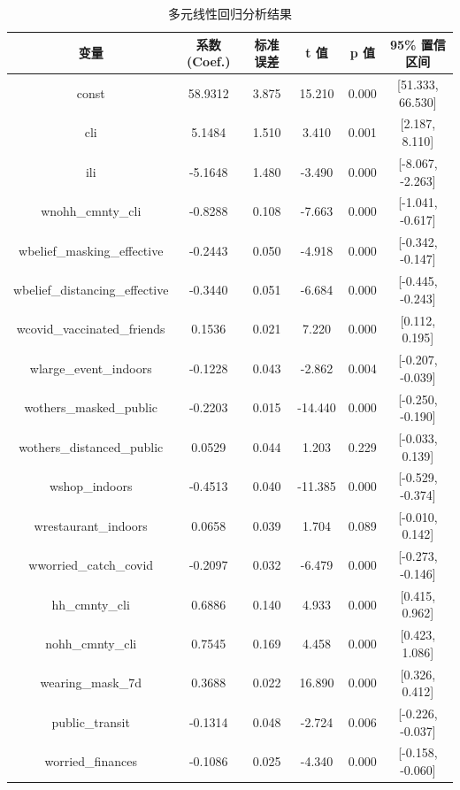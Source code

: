 \documentclass[UTF8,ctexart,a4paper,11pt,openany]{article}
\theoremstyle{definition}
\begin{document}
    \begin{table}[H]
    \centering
    \begin{tabular}{|c|c|c|c|c|c|}
        \hline
        \textbf{变量} & \textbf{系数 (Coef.)} & \textbf{标准误差} & \textbf{t 值} & \textbf{p 值} & \textbf{95\% 置信区间} \\
        \hline
        const & 58.9312 & 3.875 & 15.210 & 0.000 & [51.333, 66.530] \\
        \hline
        cli & 5.1484 & 1.510 & 3.410 & 0.001 & [2.187, 8.110] \\
        \hline
        ili & -5.1648 & 1.480 & -3.490 & 0.000 & [-8.067, -2.263] \\
        \hline
        wnohh\_cmnty\_cli & -0.8288 & 0.108 & -7.663 & 0.000 & [-1.041, -0.617] \\
        \hline
        wbelief\_masking\_effective & -0.2443 & 0.050 & -4.918 & 0.000 & [-0.342, -0.147] \\
        \hline
        wbelief\_distancing\_effective & -0.3440 & 0.051 & -6.684 & 0.000 & [-0.445, -0.243] \\
        \hline
        wcovid\_vaccinated\_friends & 0.1536 & 0.021 & 7.220 & 0.000 & [0.112, 0.195] \\
        \hline
        wlarge\_event\_indoors & -0.1228 & 0.043 & -2.862 & 0.004 & [-0.207, -0.039] \\
        \hline
        wothers\_masked\_public & -0.2203 & 0.015 & -14.440 & 0.000 & [-0.250, -0.190] \\
        \hline
        wothers\_distanced\_public & 0.0529 & 0.044 & 1.203 & 0.229 & [-0.033, 0.139] \\
        \hline
        wshop\_indoors & -0.4513 & 0.040 & -11.385 & 0.000 & [-0.529, -0.374] \\
        \hline
        wrestaurant\_indoors & 0.0658 & 0.039 & 1.704 & 0.089 & [-0.010, 0.142] \\
        \hline
        wworried\_catch\_covid & -0.2097 & 0.032 & -6.479 & 0.000 & [-0.273, -0.146] \\
        \hline
        hh\_cmnty\_cli & 0.6886 & 0.140 & 4.933 & 0.000 & [0.415, 0.962] \\
        \hline
        nohh\_cmnty\_cli & 0.7545 & 0.169 & 4.458 & 0.000 & [0.423, 1.086] \\
        \hline
        wearing\_mask\_7d & 0.3688 & 0.022 & 16.890 & 0.000 & [0.326, 0.412] \\
        \hline
        public\_transit & -0.1314 & 0.048 & -2.724 & 0.006 & [-0.226, -0.037] \\
        \hline
        worried\_finances & -0.1086 & 0.025 & -4.340 & 0.000 & [-0.158, -0.060] \\
        \hline
    \end{tabular}
    \caption{多元线性回归分析结果}
    \label{tab:regression_results}
    \end{table}
\end{document}
